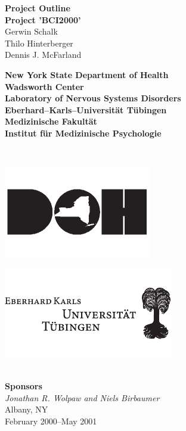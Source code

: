\begin{titlepage}
\hspace{-7mm}%
\begin{minipage}{\textwidth}
\begin{center}
\vspace{.5cm}
{\large \bf Project Outline\\[3ex]}
{\huge \bf Project 'BCI2000'}
\\[1.5cm]
{\Large Gerwin Schalk\\}
{\Large Thilo Hinterberger\\}
{\Large Dennis J. McFarland\\[1.5cm]}
%
\begin{minipage}{13cm}
  \begin{minipage}[c]{13cm}
    \begin{center}
      {\Large \bf New York State Department of Health\\[2ex]}
      {\large \bf Wadsworth Center\\[0.5ex]
       Laboratory of Nervous Systems Disorders\\[4ex]}
      {\Large \bf Eberhard--Karls--Universit\"at T\"ubingen\\[2ex]}
      {\large \bf Medizinische Fakult\"at\\[0.5ex]
       Institut f\"ur Medizinische Psychologie\\[0.5ex]}
    \end{center}
  \end{minipage}
  \\[1.0cm]
  \begin{minipage}[c]{6cm}
    \centerline{\includegraphics{figures/DOHlogo}}
  \end{minipage}
  \hspace{1.5cm}
  \begin{minipage}[c]{3cm}
    \centerline{\includegraphics{figures/EKUlogo}}
  \end{minipage}
\end{minipage}
%
\\[1.0cm]
\textbf{Sponsors} \\
\textit{Jonathan R. Wolpaw and Niels Birbaumer}
\\[1.5cm]
{Albany, NY} \\[1ex]
{February 2000--May 2001}
\end{center}
\end{minipage}
\end{titlepage}
